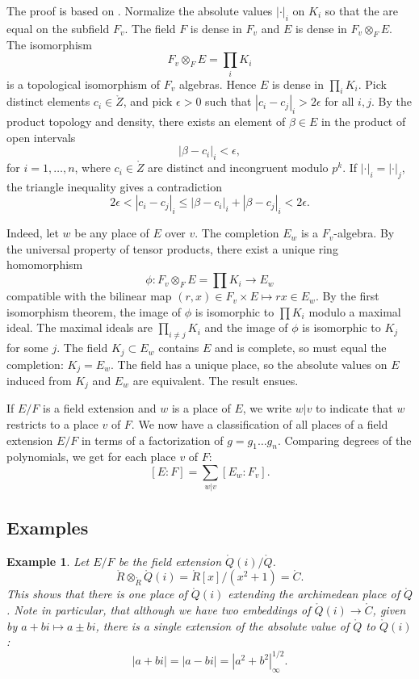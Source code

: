 \documentclass{amsart}
\newtheorem{example}[exercise]{Example}
\def\abs#1{{|#1|}}
\def\CC{\ring{C}}
\def\RR{\ring{R}}
\begin{document}
  The proof
is based on . Normalize
the absolute values $\abs{\cdot}_i$ on $K_i$  so that the are equal on the
subfield $F_v$.  The field $F$ is dense in $F_v$ and $E$ is dense
in $F_v\otimes_F E$.  The isomorphism
\[
F_v\otimes_F E = \prod_i K_i
\]
is a topological isomorphism of $F_v$ algebras.  Hence $E$ is
dense in $\prod_i K_i$.  Pick distinct elements $c_i\in\ring{Z}$,
and pick $\epsilon>0$ such that $\abs{c_i-c_j}_i > 2\epsilon$ for all $i,j$.
By the product topology and density, there exists an
element of $\beta\in E$ in the product of open intervals
\[
\abs{\beta-c_i}_i< \epsilon,
\]
for $i=1,\ldots,n$,
where $c_i\in\ring{Z}$ are distinct and incongruent modulo $p^k$.
If $\abs{\cdot}_i = \abs{\cdot}_j$, the triangle inequality gives a contradiction
\[
2\epsilon < \abs{c_i-c_j}_i \le \abs{\beta-c_i}_i + \abs{\beta-c_j}_i < 2\epsilon.
\]

  Indeed, let $w$ be any place of $E$ over $v$.
The completion $E_w$ is a $F_v$-algebra.  By the universal property
of tensor products, there exist a unique ring homomorphism 
\[
\phi:F_v\otimes_F E =\prod K_i \to E_w
\]
compatible with the bilinear map $(r,x)\in F_v\times E \mapsto r x\in E_w$.
By the first isomorphism theorem, the image of $\phi$ is isomorphic
to $\prod K_i$ modulo a maximal ideal.  The maximal ideals
are $\prod_{i\ne j} K_i$ and the image of $\phi$ is isomorphic to $K_j$ for
some $j$.  The field $K_j\subset E_w$ contains $E$ and is complete,
so must equal the completion: $K_j = E_w$.  The field has a unique place,
so the absolute values on $E$ induced from $K_j$ and $E_w$ are equivalent.
The result ensues.

If $E/F$ is a field extension and
$w$ is a place of $E$, we write $w|v$ to indicate that $w$ restricts
to a place $v$ of $F$.
We now have a classification of all places of a field extension $E/F$ in
terms of a factorization of $g = g_1\ldots g_n$. Comparing degrees of
the polynomials, we get for each place $v$ of $F$:
\[
[E:F] = \sum_{w|v} [E_w:F_v].
\]

\subsection{Examples}

\begin{example}  Let $E/F$ be the field extension $\ring{Q}(i)/\ring{Q}$.
\[
\RR\otimes_\RR \ring{Q}(i) = \RR[x]/(x^2+1) = \CC.
\]
This shows that there is one place of $\ring{Q}(i)$ extending the archimedean
place of $\ring{Q}$.  Note in particular, that although we have two embeddings
of $\ring{Q}(i)\to\CC$, given by $a+bi \mapsto a \pm b i$, there is a single
extension of the absolute value of $\ring{Q}$ to $\ring{Q}(i)$:
\[
\abs{a + bi } = \abs{a - bi} = \abs{a^2 + b^2}^{1/2}_\infty.
\]
\end{example}
\end{document}
